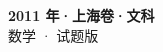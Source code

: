 \documentclass[zihao=-4, a4paper]{ctexart}
\begin{document}
\begin{center}
  {\Large\bfseries 2011 年·上海卷·文科}\\[4pt]
  {\large 数学 · 试题版}
\end{center}
\medskip
{}

\end{document}
